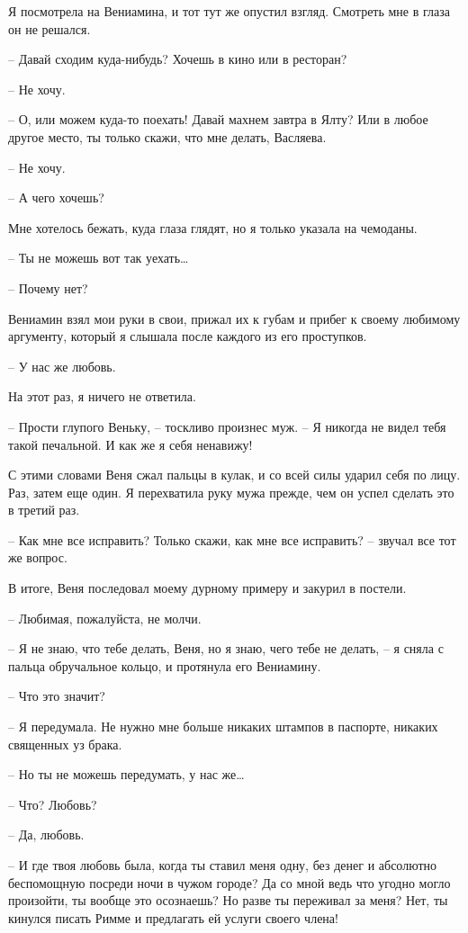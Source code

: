 \documentclass[
]{book}
\begin{document}
Я посмотрела на Вениамина, и тот тут же опустил взгляд. Смотреть мне в глаза он не решался.

-- Давай сходим куда-нибудь? Хочешь в кино или в ресторан?

-- Не хочу.

-- О, или можем куда-то поехать! Давай махнем завтра в Ялту? Или в любое другое место, ты только скажи, что мне делать, Васляева.

-- Не хочу.

-- А чего хочешь?

Мне хотелось бежать, куда глаза глядят, но я только указала на чемоданы.

-- Ты не можешь вот так уехать\ldots{}

-- Почему нет?

Вениамин взял мои руки в свои, прижал их к губам и прибег к своему любимому аргументу, который я слышала после каждого из его проступков.

-- У нас же любовь.

На этот раз, я ничего не ответила.

-- Прости глупого Веньку, -- тоскливо произнес муж. -- Я никогда не видел тебя такой печальной. И как же я себя ненавижу!

С этими словами Веня сжал пальцы в кулак, и со всей силы ударил себя по лицу. Раз, затем еще один. Я перехватила руку мужа прежде, чем он успел сделать это в третий раз.

-- Как мне все исправить? Только скажи, как мне все исправить? -- звучал все тот же вопрос.

В итоге, Веня последовал моему дурному примеру и закурил в постели.

-- Любимая, пожалуйста, не молчи.

-- Я не знаю, что тебе делать, Веня, но я знаю, чего тебе не делать, -- я сняла с пальца обручальное кольцо, и протянула его Вениамину.

-- Что это значит?

-- Я передумала. Не нужно мне больше никаких штампов в паспорте, никаких священных уз брака.

-- Но ты не можешь передумать, у нас же\ldots{}

-- Что? Любовь?

-- Да, любовь.

-- И где твоя любовь была, когда ты ставил меня одну, без денег и абсолютно беспомощную посреди ночи в чужом городе? Да со мной ведь что угодно могло произойти, ты вообще это осознаешь? Но разве ты переживал за меня? Нет, ты кинулся писать Римме и предлагать ей услуги своего члена!
\end{document}
